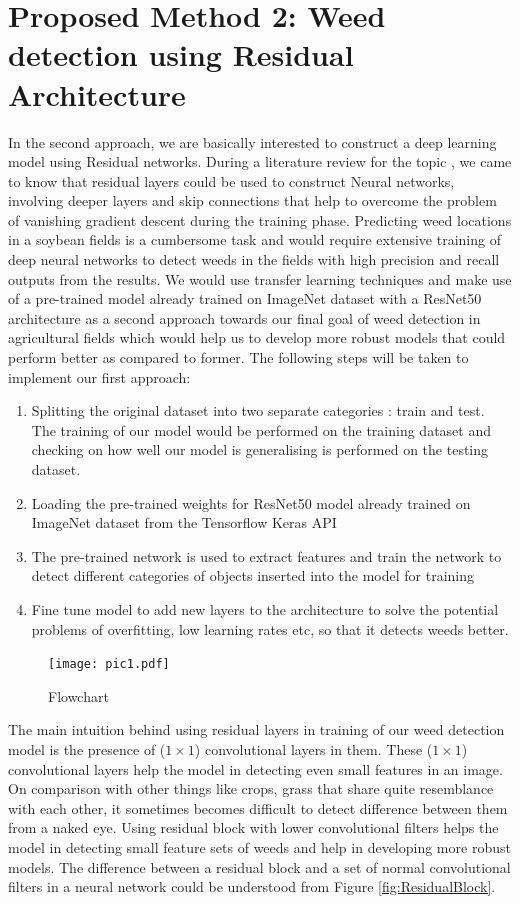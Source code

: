 \documentclass{report}
\begin{document}
\section{Proposed Method 2: Weed detection using Residual Architecture}

In the second approach, we are basically interested to construct a deep learning model using Residual networks. During a literature review for the topic \cite{ResNetArchi}, we came to know that residual layers could be used to construct Neural networks, involving deeper layers and skip connections that help to overcome the problem of vanishing gradient descent during the training phase. Predicting weed locations in a soybean fields is a cumbersome task and would require extensive training of deep neural networks to detect weeds in the fields with high precision and recall outputs from the results. We would use transfer learning techniques and make use of a pre-trained model already trained on ImageNet dataset with a ResNet50 architecture as a second approach towards our final goal of weed detection in agricultural fields which would help us to develop more robust models that could perform better as compared to former. The following steps will be taken to implement our first approach:

\begin{enumerate}
	\item Splitting the original dataset into two separate categories : train and test. The training of our model would be performed on the training dataset and checking on how well our model is generalising is performed on the testing dataset. 
	\item Loading the pre-trained weights for ResNet50 model already trained on ImageNet dataset from the Tensorflow Keras API
	\item The pre-trained network is used to extract features and train the network to detect different categories of objects inserted into the model for training 
	\item Fine tune model to add new layers to the architecture to solve the potential problems of overfitting, low learning rates etc, so that it detects weeds better.

\end{enumerate}
\begin{figure}[H]
\centering
\texttt{[image: pic1.pdf]}
\caption{Flowchart}
\label{fig:Flowchart}
\end{figure}

The main intuition behind using residual layers in training of our weed detection model is the presence of ($1 \times 1$) convolutional layers in them. These ($1 \times 1$) convolutional layers help the model in detecting even small features in an image. On comparison with other things like crops, grass that share quite resemblance with each other, it sometimes becomes difficult to detect difference between them from a naked eye. Using residual block with lower convolutional filters helps the model in detecting small feature sets of weeds and help in developing more robust models. The difference between a residual block and a set of normal convolutional filters in a neural network could be understood from Figure \ref{fig:ResidualBlock}. 
\end{document}
